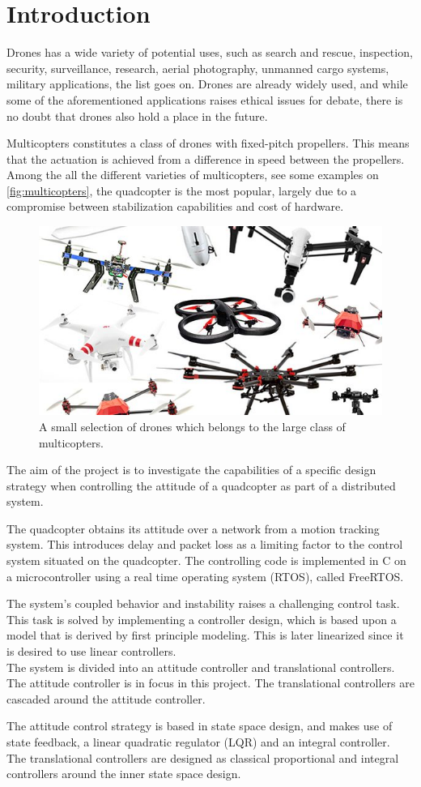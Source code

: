\chapter{Introduction}
Drones has a wide variety of potential uses, such as search and rescue, inspection, security, surveillance, research, aerial photography, unmanned cargo systems, military applications, the list goes on. Drones are already widely used, and while some of the aforementioned applications raises ethical issues for debate, there is no doubt that drones also hold a place in the future.

Multicopters constitutes a class of drones with fixed-pitch propellers. This means that the actuation is achieved from a difference in speed between the propellers. Among the all the different varieties of multicopters, see some examples on \autoref{fig:multicopters}, the quadcopter is the most popular, largely due to a compromise between stabilization capabilities and cost of hardware. \cite{TypesOfMulticopter}

\begin{figure}[H]
  \centering
  \includegraphics[width=.6\linewidth]{figures/multicopters}
  \caption{A small selection of drones which belongs to the large class of multicopters. \cite{multiCopterPhoto}}
  \label{fig:multicopters}
\end{figure}

The aim of the project is to investigate the capabilities of a specific design strategy when controlling the attitude of a quadcopter as part of a distributed system.

The quadcopter obtains its attitude over a network from a motion tracking system. This introduces delay and packet loss as a limiting factor to the control system situated on the quadcopter. The controlling code is implemented in C on a microcontroller using a real time operating system (RTOS), called FreeRTOS.

The system's coupled behavior and instability raises a challenging control task. This task is solved by implementing a controller design, which is based upon a model that is derived by first principle modeling. This is later linearized since it is desired to use linear controllers.\\
The system is divided into an attitude controller and translational controllers. The attitude controller is in focus in this project. The translational controllers are cascaded around the attitude controller.

The attitude control strategy is based in state space design, and makes use of state feedback, a linear quadratic regulator (LQR) and an integral controller.\\
The translational controllers are designed as classical proportional and integral controllers around the inner state space design.